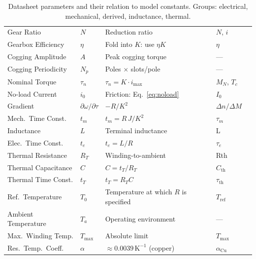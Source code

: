 \documentclass[10pt, a4paper, twocolumn]{article}
\let\oldtexttt\texttt
\renewcommand{\texttt}[1]{{\smaller\oldtexttt{#1}}}
\newcommand{\atL}{\texttt{inductance:L}}
\newcommand{\atTE}{\texttt{inductance:timeconst}}
\newcommand{\atCOGA}{\texttt{cogging:amplitude}}
\newcommand{\atCOGP}{\texttt{cogging:poles}}
\newcommand{\atRT}{\texttt{thermal:resistance}}
\newcommand{\atTC}{\texttt{thermal:capacitance}}
\newcommand{\atTT}{\texttt{thermal:timeconst}}
\newcommand{\atALPHA}{\texttt{thermal:tempcoef}}
\newcommand{\atTREF}{\texttt{thermal:reftemp}}
\newcommand{\atTAMB}{\texttt{thermal:ambient}}
\begin{document}
\begin{table}[H]
\begin{tabular}{@{}lllll@{}}
Gear Ratio & $N$ & Reduction ratio & $N$, $i$ & \texttt{gear} \\
Gearbox Efficiency & $\eta$ & Fold into $K$: use $\eta K$ & $\eta$ & \\
Cogging Amplitude & $A$ & Peak cogging torque & --- & \atCOGA{} \\
Cogging Periodicity & $N_p$ & Poles $\times$ slots/pole & --- & \atCOGP{} \\
\midrule
Nominal Torque & $\tau_n$ & $\tau_n = K \cdot i_{\max}$ & $M_N$, $T_c$ & \\
No-load Current & $i_0$ & Friction: Eq.~\eqref{eq:noload} & $I_0$ & \\
Gradient & $\partial\omega/\partial\tau$ & $-R / K^2$ & $\Delta n / \Delta M$ & \\
Mech.\ Time Const. & $t_m$ & $t_m = R\,J / K^2$ & $\tau_m$ & \\
\midrule
Inductance & $L$ & Terminal inductance & L & \atL{} \\
Elec.\ Time Const. & $t_e$ & $t_e = L / R$ & $\tau_e$ & \atTE{} \\
\midrule
Thermal Resistance & $R_T$ & Winding-to-ambient & Rth & \atRT{} \\
Thermal Capacitance & $C$ & $C = t_T / R_T$ & $C_{\text{th}}$ & \atTC{} \\
Thermal Time Const. & $t_T$ & $t_T = R_T C$ & $\tau_{\text{th}}$ & \atTT{} \\
Ref.\ Temperature & $T_0$ & Temperature at which $R$ is specified & $T_{\text{ref}}$ & \atTREF{} \\
Ambient Temperature & $T_a$ & Operating environment & --- & \atTAMB{} \\
Max.\ Winding Temp. & $T_{\max}$ & Absolute limit & $T_{\max}$ & \\
Res.\ Temp.\ Coeff. & $\alpha$ & $\approx 0.0039\, \text{K}^{-1}$ (copper) & $\alpha_{\text{Cu}}$ & \atALPHA{} \\
\bottomrule
\end{tabular}
\caption{Datasheet parameters and their relation to model constants. Groups: electrical, mechanical, derived, inductance, thermal.}
\label{tab:datasheet}
\end{table}

\small


\end{document}
